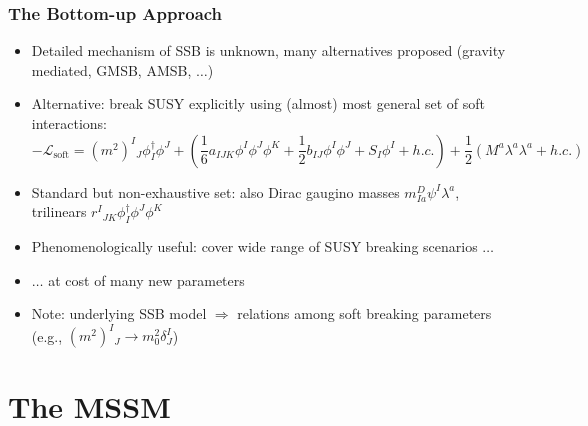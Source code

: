 \documentclass[10pt,aspectratio=169]{beamer}
\begin{document}
\begin{frame}
  \frametitle{The Bottom-up Approach}
  \begin{itemize}\itemsep1em
  \item \alert{Detailed mechanism of SSB is unknown, many alternatives proposed}
    (gravity mediated, GMSB, AMSB, $\ldots$)
  \item Alternative: break SUSY explicitly using (almost) most general
    set of soft interactions:
    \begin{equation*}
      -\mathcal{L}_{\text{soft}} =  (m^2)^I{}_J \phi^\dagger_I \phi^J +
      \left ( \frac{1}{6} a_{IJK} \phi^I \phi^J \phi^K
      + \frac{1}{2} b_{IJ} \phi^I \phi^J + S_I \phi^I
      + h.c. \right ) + \frac{1}{2} \left ( M^a \lambda^a \lambda^a + h.c.
      \right )
    \end{equation*}
  \item \alert{Standard but non-exhaustive set}: also Dirac gaugino masses
    $m^D_{Ia}\psi^I \lambda^a$,
    trilinears $r^I{}_{JK} \phi^\dagger_I \phi^J\phi^K$
  \item {\color{blue} Phenomenologically useful:} cover wide range of SUSY
    breaking scenarios $\ldots$
  \item $\ldots$ \alert{at cost of many new parameters}
  \item Note: underlying SSB model $\Rightarrow$ relations among soft
    breaking parameters (e.g., $(m^2)^I{}_J \to m_0^2 \delta^I_J$)
  \end{itemize}
\end{frame}

\section{The MSSM}
\end{document}
